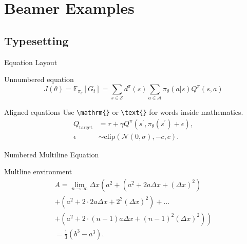 \documentclass{beamer}
\begin{document}
\section{Beamer Examples}

\subsection{Typesetting}

\begin{frame}[fragile]{Equation Layout}
  \begin{exampleblock}{Unnumbered equation}
    \begin{equation*}
      J(\theta)
      = \mathbb{E}_{\pi_\theta}[G_t]
      = \sum_{s\in\mathcal{S}} d^\pi(s)
        \sum_{a\in\mathcal{A}}\pi_\theta(a|s)Q^\pi(s,a)
    \end{equation*}
  \end{exampleblock}

  \begin{exampleblock}{Aligned equations}
    Use \verb|\mathrm{}| or \verb|\text{}| for words inside mathematics.
    \begin{align}
      Q_\mathrm{target}
        &= r+\gamma Q^\pi(s^\prime,\pi_\theta(s^\prime)+\epsilon),\\
      \epsilon
        &\sim\mathrm{clip}(\mathcal{N}(0,\sigma),-c,c).\nonumber
    \end{align}
  \end{exampleblock}
\end{frame}

\begin{frame}{Numbered Multiline Equation}
  \begin{exampleblock}{Multline environment}
    \begin{multline}
      A=\lim_{n\rightarrow\infty}\Delta x
      \left(a^{2}
      +\left(a^{2}+2a\Delta x+\left(\Delta x\right)^{2}\right)\right.\\
      +\left(a^{2}+2\cdot2a\Delta x+2^{2}\left(\Delta x\right)^{2}\right)
      +\ldots\\
      \left.
      +\left(a^{2}+2\cdot(n-1)a\Delta x
      +(n-1)^{2}\left(\Delta x\right)^{2}\right)\right)\\
      =\frac{1}{3}\left(b^{3}-a^{3}\right).
    \end{multline}
  \end{exampleblock}
\end{frame}
\end{document}
